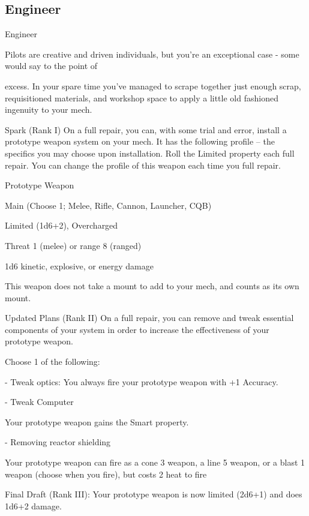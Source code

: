\subsection{Engineer}

                                                   Engineer

Pilots are creative and driven individuals, but you’re an exceptional case - some would say to the point of

excess. In your spare time you’ve managed to scrape together just enough scrap, requisitioned materials,
and workshop space to apply a little old fashioned ingenuity to your mech.

Spark (Rank I)
On a full repair, you can, with some trial and error, install a prototype weapon system on your
mech. It has the following profile -- the specifics you may choose upon installation. Roll the
Limited property each full repair. You can change the profile of this weapon each time you full
repair.

         Prototype Weapon

         Main (Choose 1; Melee, Rifle, Cannon, Launcher, CQB)

         Limited (1d6+2), Overcharged

         Threat 1 (melee) or range 8 (ranged)

         1d6 kinetic, explosive, or energy damage

This weapon does not take a mount to add to your mech, and counts as its own mount.

Updated Plans  (Rank II)
On a full repair, you can remove and tweak essential components of your system in order to
increase the effectiveness of your prototype weapon.

Choose 1 of the following:

  - Tweak optics:
         You always fire your prototype weapon with +1 Accuracy.

  - Tweak Computer





         Your prototype weapon gains the Smart property.

  - Removing reactor shielding

         Your prototype weapon can fire as a cone 3 weapon, a line 5 weapon, or a blast 1
         weapon (choose when you fire), but costs 2 heat to fire

Final Draft (Rank III): Your prototype weapon is now limited (2d6+1) and does 1d6+2 damage.
